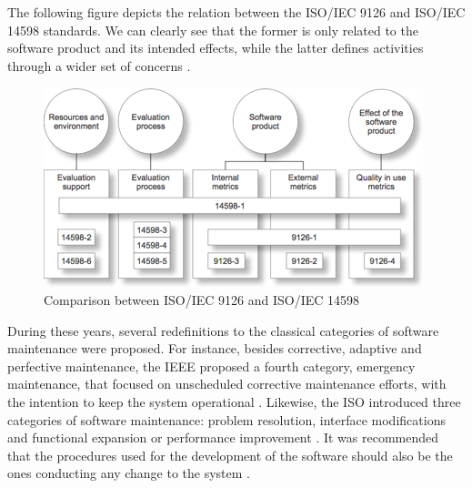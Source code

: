 \documentclass[10pt]{article}
\begin{document}
The following figure depicts the relation between the ISO/IEC 9126 and ISO/IEC 14598 standards. We can clearly see that the former is only related to the software product and its intended effects, while the latter defines activities through a wider set of concerns \cite{ISO07}.

\begin{figure}[htbp]
	\centering
		\includegraphics[scale=0.55]{img/Comparison_between_ISO_IEC_9126_and_ISO_IEC_14598.png}
	\caption{Comparison between ISO/IEC 9126 and ISO/IEC 14598}
	\label{fig:Comparison_between_ISO_IEC_9126_and_ISO_IEC_14598}
\end{figure}

During these years, several redefinitions to the classical categories of software maintenance were proposed. For instance, besides corrective, adaptive and perfective maintenance, the IEEE proposed a fourth category, emergency maintenance, that focused on unscheduled corrective maintenance efforts, with the intention to keep the system operational \cite{Edelstein93}. Likewise, the ISO introduced three categories of software maintenance: problem resolution, interface modifications and functional expansion or performance improvement \cite{Jarvis95}. It was recommended that the procedures used for the development of the software should also be the ones conducting any change to the system \cite{Jarvis95}.
\end{document}
